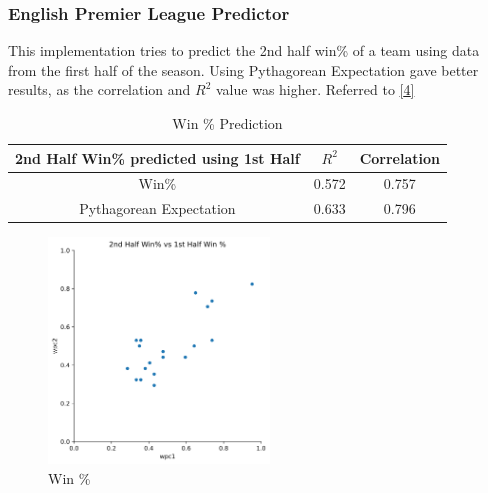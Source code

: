 \documentclass[
  english,
  doc,floatsintext]{apa6}
\begin{document}
\hypertarget{english-premier-league-predictor}{%
\subsubsection{English Premier League Predictor}\label{english-premier-league-predictor}}

This implementation tries to predict the 2nd half win\% of a team using data from the first half of the season. Using Pythagorean Expectation gave better results, as the correlation and \(R^2\) value was higher. Referred to \protect\hyperlink{ref-FoundationsSportsAnalytics}{{[}4{]}}

\begin{table}[H]
  \begin{center}
  \begin{tabular}{|c|c|c|}
  \hline
  \textbf{2nd Half Win\% predicted using 1st Half} & \textbf{$R^2$} & \textbf{Correlation} \\ \hline
  Win\%                                            & 0.572          & 0.757                \\ \hline
  Pythagorean Expectation                          & 0.633          & 0.796                \\ \hline
  \end{tabular}
  \end{center}
  
  \captionsetup{justification=centering}
  \caption{Win \% Prediction}
\end{table}

\begin{figure}[H]
  \begin{center}
  \includegraphics[width=0.9\linewidth, height=6cm]{assets/win.png}
  \end{center}
  
  \captionsetup{justification=centering}
  \caption{Win \%}
\end{figure}
\end{document}
